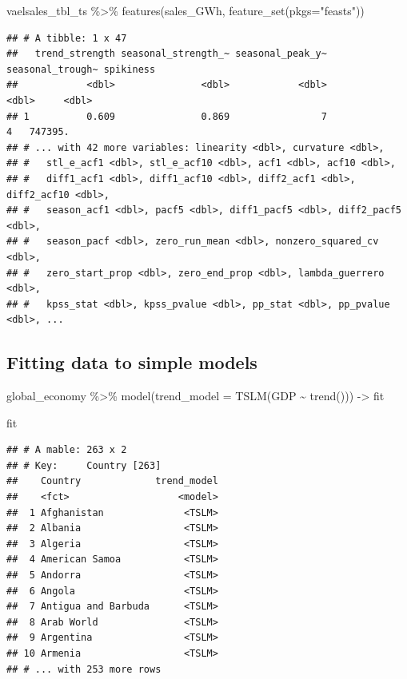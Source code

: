 \documentclass[
]{book}
\newenvironment{Shaded}{\begin{snugshade}}{\end{snugshade}}
\newcommand{\AttributeTok}[1]{\textcolor[rgb]{0.77,0.63,0.00}{#1}}
\newcommand{\FunctionTok}[1]{\textcolor[rgb]{0.00,0.00,0.00}{#1}}
\newcommand{\NormalTok}[1]{#1}
\newcommand{\OtherTok}[1]{\textcolor[rgb]{0.56,0.35,0.01}{#1}}
\newcommand{\SpecialCharTok}[1]{\textcolor[rgb]{0.00,0.00,0.00}{#1}}
\newcommand{\StringTok}[1]{\textcolor[rgb]{0.31,0.60,0.02}{#1}}
\begin{document}
\begin{Shaded}
\begin{Highlighting}[]
\NormalTok{vaelsales\_tbl\_ts }\SpecialCharTok{\%\textgreater{}\%} \FunctionTok{features}\NormalTok{(sales\_GWh, }\FunctionTok{feature\_set}\NormalTok{(}\AttributeTok{pkgs=}\StringTok{"feasts"}\NormalTok{))}
\end{Highlighting}
\end{Shaded}

\begin{verbatim}
## # A tibble: 1 x 47
##   trend_strength seasonal_strength_~ seasonal_peak_y~ seasonal_trough~ spikiness
##            <dbl>               <dbl>            <dbl>            <dbl>     <dbl>
## 1          0.609               0.869                7                4   747395.
## # ... with 42 more variables: linearity <dbl>, curvature <dbl>,
## #   stl_e_acf1 <dbl>, stl_e_acf10 <dbl>, acf1 <dbl>, acf10 <dbl>,
## #   diff1_acf1 <dbl>, diff1_acf10 <dbl>, diff2_acf1 <dbl>, diff2_acf10 <dbl>,
## #   season_acf1 <dbl>, pacf5 <dbl>, diff1_pacf5 <dbl>, diff2_pacf5 <dbl>,
## #   season_pacf <dbl>, zero_run_mean <dbl>, nonzero_squared_cv <dbl>,
## #   zero_start_prop <dbl>, zero_end_prop <dbl>, lambda_guerrero <dbl>,
## #   kpss_stat <dbl>, kpss_pvalue <dbl>, pp_stat <dbl>, pp_pvalue <dbl>, ...
\end{verbatim}

\hypertarget{fitting-data-to-simple-models-1}{%
\subsection{Fitting data to simple models}\label{fitting-data-to-simple-models-1}}

\begin{Shaded}
\begin{Highlighting}[]
\NormalTok{global\_economy }\SpecialCharTok{\%\textgreater{}\%} \FunctionTok{model}\NormalTok{(}\AttributeTok{trend\_model =} \FunctionTok{TSLM}\NormalTok{(GDP }\SpecialCharTok{\textasciitilde{}} \FunctionTok{trend}\NormalTok{())) }\OtherTok{{-}\textgreater{}}\NormalTok{ fit}

\NormalTok{fit}
\end{Highlighting}
\end{Shaded}

\begin{verbatim}
## # A mable: 263 x 2
## # Key:     Country [263]
##    Country             trend_model
##    <fct>                   <model>
##  1 Afghanistan              <TSLM>
##  2 Albania                  <TSLM>
##  3 Algeria                  <TSLM>
##  4 American Samoa           <TSLM>
##  5 Andorra                  <TSLM>
##  6 Angola                   <TSLM>
##  7 Antigua and Barbuda      <TSLM>
##  8 Arab World               <TSLM>
##  9 Argentina                <TSLM>
## 10 Armenia                  <TSLM>
## # ... with 253 more rows
\end{verbatim}
\end{document}
